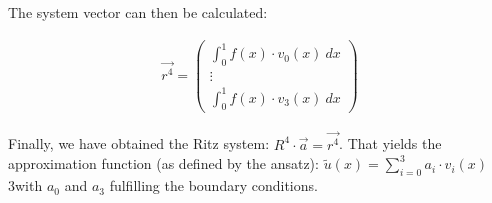The system vector can then be calculated:

\begin{align*}
	\vec{r^4} = \begin{pmatrix}
		\int_0^1 f(x)\cdot v_0(x)\ dx \\
		\vdots \\
		\int_0^1 f(x)\cdot v_3(x)\ dx
	\end{pmatrix}
\end{align*}

Finally, we have obtained the Ritz system: $R^4\cdot\vec{a}=\vec{r^4}$.
That yields the approximation function (as defined by the ansatz): $\tilde{u}(x)=\sum_{i=0}^3 a_i\cdot v_i(x)$
3with $a_0$ and $a_3$ fulfilling the boundary conditions.